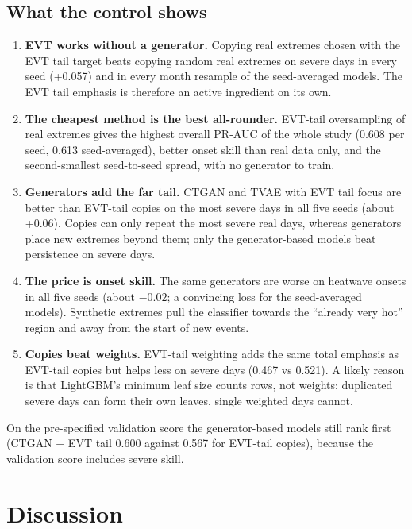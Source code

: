 \documentclass[11pt,a4paper]{article}
\begin{document}
\subsection{What the control shows}
\begin{enumerate}
  \item \textbf{EVT works without a generator.} Copying real extremes chosen with the EVT tail target beats copying
        random real extremes on severe days in every seed (+0.057) and in every month resample of the seed-averaged
        models. The EVT tail emphasis is therefore an active ingredient on its own.
  \item \textbf{The cheapest method is the best all-rounder.} EVT-tail oversampling of real extremes gives the highest
        overall PR-AUC of the whole study (0.608 per seed, 0.613 seed-averaged), better onset skill than real data
        only, and the second-smallest seed-to-seed spread, with no generator to train.
  \item \textbf{Generators add the far tail.} CTGAN and TVAE with EVT tail focus are better than EVT-tail copies on the
        most severe days in all five seeds (about +0.06). Copies can only repeat the most severe real days, whereas
        generators place new extremes beyond them; only the generator-based models beat persistence on severe days.
  \item \textbf{The price is onset skill.} The same generators are worse on heatwave onsets in all five seeds (about
        $-0.02$; a convincing loss for the seed-averaged models). Synthetic extremes pull the classifier towards the
        ``already very hot'' region and away from the start of new events.
  \item \textbf{Copies beat weights.} EVT-tail weighting adds the same total emphasis as EVT-tail copies but helps less
        on severe days (0.467 vs 0.521). A likely reason is that LightGBM's minimum leaf size counts rows, not
        weights: duplicated severe days can form their own leaves, single weighted days cannot.
\end{enumerate}
On the pre-specified validation score the generator-based models still rank first (CTGAN + EVT tail 0.600 against
0.567 for EVT-tail copies), because the validation score includes severe skill.

\section{Discussion}
\end{document}
